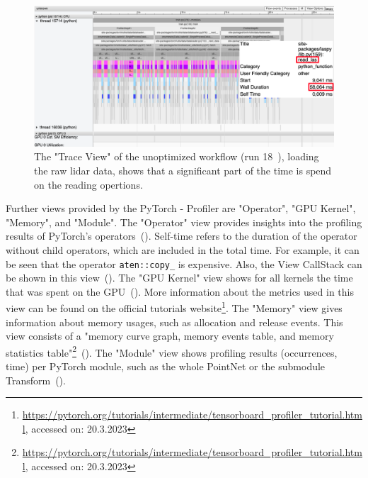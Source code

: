 \documentclass[12pt, a4paper, hidelinks]{article}
\begin{document}
\begin{figure}[H]
\centering
\includegraphics[width=1\textwidth]{./assets/scap_gtx1080_profiler-torch_sample-points_14650750_trace-view-laspy}
\caption[PyTorch - Profiler: Trace View of data input for run 18]{The "Trace View" of the unoptimized workflow (run 18~), loading the raw \ac{lidar} data, shows that a significant part of the time is spend on the reading opertions.}
\label{fig:scap_gtx1080_profiler-torch_sample-points_14650750_trace-view-laspy}
\end{figure}

Further views provided by the PyTorch - Profiler are "Operator", "GPU Kernel", "Memory", and "Module".
The "Operator" view provides insights into the profiling results of PyTorch's operators~(). Self-time refers to the duration of the operator without child operators, which are included in the total time. For example, it can be seen that the operator \texttt{aten::copy\_} is expensive. Also, the View CallStack can be shown in this view~().
The "GPU Kernel" view shows for all kernels the time that was spent on the \ac{GPU}~(). More information about the metrics used in this view can be found on the official tutorials website\footnote{\url{https://pytorch.org/tutorials/intermediate/tensorboard_profiler_tutorial.html}, accessed on: 20.3.2023}.
The "Memory" view gives information about memory usages, such as allocation and release events. This view consists of a "memory curve graph, memory events table, and memory statistics table"\footnote{\url{https://pytorch.org/tutorials/intermediate/tensorboard_profiler_tutorial.html}, accessed on: 20.3.2023}~().
The "Module" view shows profiling results (occurrences, time) per PyTorch module, such as the whole PointNet or the submodule Transform~().
\end{document}
